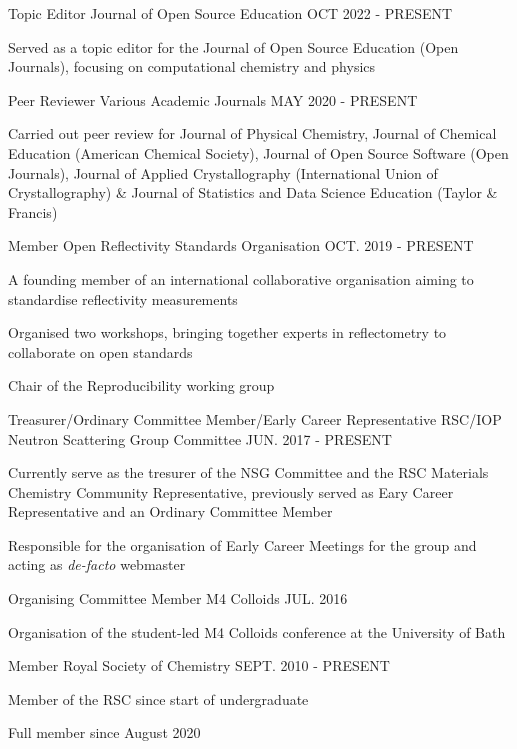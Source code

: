 \begin{cventries}
  \cventry
    {Topic Editor}
    {Journal of Open Source Education}
    {}
    {OCT 2022 - PRESENT}
    {
    	\begin{cvitems}
	    \item{Served as a topic editor for the Journal of Open Source Education (Open Journals), focusing on computational chemistry and physics}
	\end{cvitems}
    }
  \cventry
    {Peer Reviewer}
    {Various Academic Journals}
    {}
    {MAY 2020 - PRESENT}
    {
        \begin{cvitems}
            \item{Carried out peer review for Journal of Physical Chemistry, Journal of Chemical Education (American Chemical Society), Journal of Open Source Software (Open Journals), Journal of Applied Crystallography (International Union of Crystallography) \& Journal of Statistics and Data Science Education (Taylor \& Francis)}
        \end{cvitems}
    }
  \cventry
    {Member}
    {Open Reflectivity Standards Organisation}
    {}
    {OCT. 2019 - PRESENT}
    {
      \begin {cvitems}
        \item {A founding member of an international collaborative organisation aiming to standardise reflectivity measurements}
        \item {Organised two workshops, bringing together experts in reflectometry to collaborate on open standards}
        \item {Chair of the Reproducibility working group}
      \end {cvitems}
    }
  \cventry
    {Treasurer/Ordinary Committee Member/Early Career Representative}
    {RSC/IOP Neutron Scattering Group Committee}
    {}
    {JUN. 2017 - PRESENT}
    {
      \begin{cvitems}
      	\item{Currently serve as the tresurer of the NSG Committee and the RSC Materials Chemistry Community Representative, previously served as Eary Career Representative and an Ordinary Committee Member}
      	\item{Responsible for the organisation of Early Career Meetings for the group and acting as \emph{de-facto} webmaster}
	  \end{cvitems}
	}
  \cventry
    {Organising Committee Member}
    {M4 Colloids}
    {}
    {JUL. 2016}
    {
      \begin{cvitems}
        \item{Organisation of the student-led M4 Colloids conference at the University of Bath}
      \end{cvitems}
    }
  \cventry
    {Member}
    {Royal Society of Chemistry}
    {}
    {SEPT. 2010 - PRESENT}
    {
      \begin{cvitems}
      	\item{Member of the RSC since start of undergraduate}
      	\item{Full member since August 2020}
      \end{cvitems}
    }
\end{cventries}
